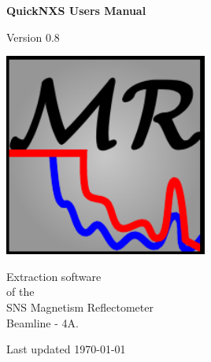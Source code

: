 \begin{titlepage}

\vspace*{0.2in}

\begin{center}
  \begin{Huge}
    \textbf{QuickNXS Users Manual}
  \end{Huge}

  \vspace*{0.3in}

  \begin{LARGE}  
    Version 0.8
  \end{LARGE}

  \vspace*{0.5in}

  \includegraphics[width=0.5\textwidth]{../../icons/logo.pdf}

  \vspace*{0.5in}
  \begin{LARGE}    
    Extraction software\\
    of the \\
    SNS Magnetism Reflectometer\\
    Beamline - 4A.
  \end{LARGE}    
    \vspace*{0.2in}
    
  \begin{large}
    Last updated \today
  \end{large}
\end{center}


 
\end{titlepage}
